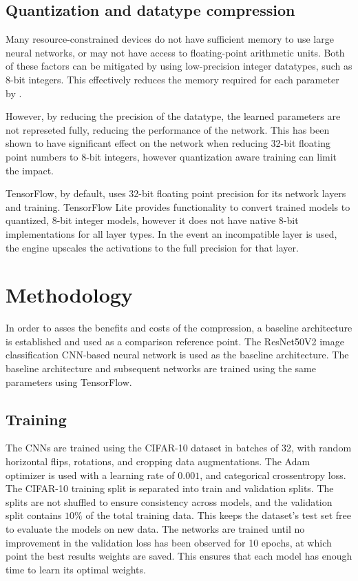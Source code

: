 \documentclass{article}
\begin{document}
	\subsection{Quantization and datatype compression}
	
	Many resource-constrained devices do not have sufficient memory to use large neural networks, or may not have access to floating-point arithmetic units. Both of these factors can be mitigated by using low-precision integer datatypes, such as 8-bit integers. This effectively reduces the memory required for each parameter by . 
	
	However, by reducing the precision of the datatype, the learned parameters are not represeted fully, reducing the performance of the network. This has been shown to have significant effect on the network when reducing 32-bit floating point numbers to 8-bit integers, however quantization aware training can limit the impact. 
	
	TensorFlow, by default, uses 32-bit floating point precision for its network layers and training. TensorFlow Lite provides functionality to convert trained models to quantized, 8-bit integer models, however it does not have native 8-bit implementations for all layer types. In the event an incompatible layer is used, the engine upscales the activations to the full precision for that layer.
	
	\section{Methodology}
	In order to asses the benefits and costs of the compression, a baseline architecture is established and used as a comparison reference point. The ResNet50V2 image classification CNN-based neural network is used as the baseline architecture. The baseline architecture and subsequent networks are trained using the same parameters using TensorFlow. 
	
	\subsection{Training}
	
	The CNNs are trained using the CIFAR-10 dataset in batches of 32, with random horizontal flips, rotations, and cropping data augmentations. The Adam optimizer is used with a learning rate of $0.001$, and categorical crossentropy loss. The CIFAR-10 training split is separated into train and validation splits. The splits are not shuffled to ensure consistency across models, and the validation split contains $10\%$ of the total training data. This keeps the dataset's test set free to evaluate the models on new data. The networks are trained until no improvement in the validation loss has been observed for 10 epochs, at which point the best results weights are saved. This ensures that each model has enough time to learn its optimal weights.
	
\end{document}
